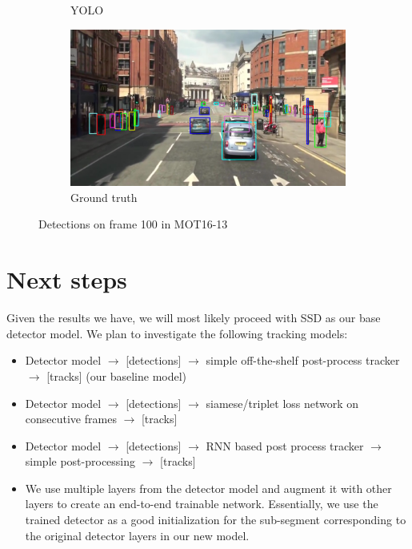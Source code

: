 \documentclass[10pt,twocolumn,letterpaper]{article}
\begin{document}
\begin{figure}[!tbp]
\begin{subfigure}[b]{0.3\textwidth}
    \caption{YOLO}
    \label{fig:yolo_mot16_13_100}
  \end{subfigure}
  \begin{subfigure}[b]{0.3\textwidth}
    \includegraphics[width=\textwidth]{gt_mot16-13-100.png}
    \caption{Ground truth}
    \label{fig:yolo_mot16_13_100}
  \end{subfigure}
  \caption{Detections on frame 100 in MOT16-13}
\end{figure}

\section{Next steps}
Given the results we have, we will most likely proceed with SSD as our base detector model. We plan to investigate the following tracking models:
\begin{itemize}
	\item Detector model $\rightarrow$ [detections] $\rightarrow$ simple off-the-shelf post-process tracker $\rightarrow$ [tracks] (our baseline model)
	\item Detector model $\rightarrow$ [detections] $\rightarrow$ siamese/triplet loss network on consecutive frames $\rightarrow$ [tracks]	
	\item Detector model $\rightarrow$ [detections] $\rightarrow$ RNN based post process tracker $\rightarrow$ simple post-processing $\rightarrow$ [tracks]
	\item We use multiple layers from the detector model and augment it with other layers to create an end-to-end trainable network. Essentially, we use the trained detector as a good initialization for the sub-segment corresponding to the original detector layers in our new model.
\end{itemize}

{\small


}
\end{document}
